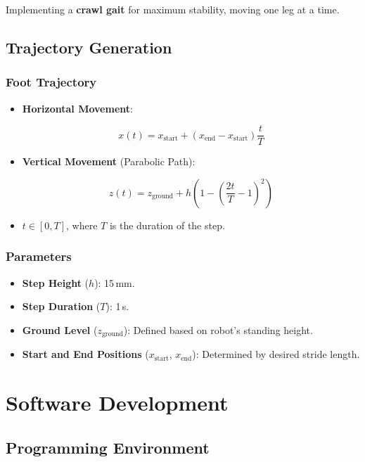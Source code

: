 \documentclass{article}
\begin{document}
Implementing a \textbf{crawl gait} for maximum stability, moving one leg at a time.

\subsection{Trajectory Generation}

\subsubsection{Foot Trajectory}

\begin{itemize}
    \item \textbf{Horizontal Movement}:

    \[
    x(t) = x_{\text{start}} + (x_{\text{end}} - x_{\text{start}}) \frac{t}{T}
    \]

    \item \textbf{Vertical Movement} (Parabolic Path):

    \[
    z(t) = z_{\text{ground}} + h \left(1 - \left( \frac{2t}{T} - 1 \right)^2 \right)
    \]

    \item $t \in [0, T]$, where $T$ is the duration of the step.
\end{itemize}

\subsubsection{Parameters}

\begin{itemize}
    \item \textbf{Step Height} ($h$): 15\,mm.
    \item \textbf{Step Duration} ($T$): 1\,s.
    \item \textbf{Ground Level} ($z_{\text{ground}}$): Defined based on robot's standing height.
    \item \textbf{Start and End Positions} ($x_{\text{start}}$, $x_{\text{end}}$): Determined by desired stride length.
\end{itemize}

\section{Software Development}

\subsection{Programming Environment}
\end{document}
